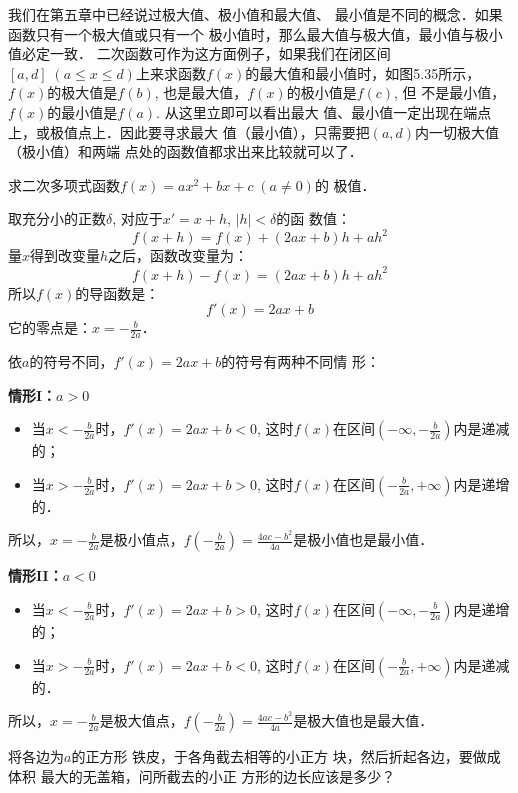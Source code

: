 我们在第五章中已经说过极大值、极小值和最大值、
最小值是不同的概念．如果函数只有一个极大值或只有一个
极小值时，那么最大值与极大值，最小值与极小值必定一致．
二次函数可作为这方面例子，如果我们在闭区间$[a,d]\; (a\le 
x\le d)$上来求函数$f(x)$的最大值和最小值时，如图5.35所示，
$f(x)$的极大值是$f(b)$, 也是最大值，$f(x)$的极小值是$f(c)$, 但
不是最小值，$f(x)$的最小值是$f(a)$. 从这里立即可以看出最大
值、最小值一定出现在端点上，或极值点上．因此要寻求最大
值（最小值），只需要把$(a,d)$内一切极大值（极小值）和两端
点处的函数值都求出来比较就可以了．

\begin{example}
    求二次多项式函数$f(x)=ax^2+bx+c\; (a\ne 0)$的
    极值．  
\end{example}

\begin{solution}
取充分小的正数$\delta$, 对应于$x'=x+h$, $|h|<\delta$的函
数值：
\[f(x+h)=f(x)+(2ax+b)h+ah^2\]
量$x$得到改变量$h$之后，函数改变量为：
\[f(x+h)-f(x)=(2ax+b)h+ah^2\]
所以$f(x)$的导函数是：
\[f'(x)=2ax+b\]
它的零点是：$x=-\frac{b}{2a}$．

依$a$的符号不同，$f'(x)=2ax+b$的符号有两种不同情
形：

\textbf{情形I：$a>0$}
\begin{itemize}
    \item 当$x<-\frac{b}{2a}$时，$f'(x)=2ax+b<0$, 这时$f(x)$在区间$\left(-\infty,-\frac{b}{2a}\right)$内是递减的；
    \item 当$x>-\frac{b}{2a}$时，$f'(x)=2ax+b>0$, 这时$f(x)$在区间$\left(-\frac{b}{2a},+\infty\right)$内是递增的．
\end{itemize}

所以，$x=-\frac{b}{2a}$是极小值点，$f\left(-\frac{b}{2a}\right)=\frac{4ac-b^2}{4a}$是极小值也是最小值．

\textbf{情形II：$a<0$}
\begin{itemize}
    \item 当$x<-\frac{b}{2a}$时，$f'(x)=2ax+b>0$, 这时$f(x)$在区间$\left(-\infty,-\frac{b}{2a}\right)$内是递增的；
    \item 当$x>-\frac{b}{2a}$时，$f'(x)=2ax+b<0$, 这时$f(x)$在区间$\left(-\frac{b}{2a},+\infty\right)$内是递减的．
\end{itemize}

所以，$x=-\frac{b}{2a}$是极大值点，$f\left(-\frac{b}{2a}\right)=\frac{4ac-b^2}{4a}$是极大值也是最大值．
\end{solution}


\begin{example}
将各边为$a$的正方形
铁皮，于各角截去相等的小正方
块，然后折起各边，要做成体积
最大的无盖箱，问所截去的小正
方形的边长应该是多少？
\end{example}

